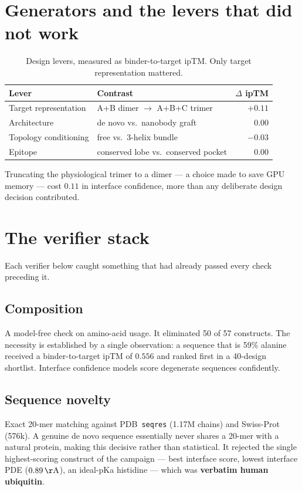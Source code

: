 \documentclass[11pt,a4paper]{article}
\newcommand{\unit}[1]{\,\mathrm{#1}}
\begin{document}
\section{Generators and the levers that did not work}

\begin{table}[htbp]
\centering
\caption{Design levers, measured as binder-to-target ipTM. Only target representation mattered.}
\label{tab:levers}
\begin{tabular}{llr}
\toprule
Lever & Contrast & $\Delta$ ipTM \\
\midrule
Target representation & A+B dimer $\rightarrow$ A+B+C trimer & $+0.11$ \\
Architecture & de novo vs.\ nanobody graft & $0.00$ \\
Topology conditioning & free vs.\ 3-helix bundle & $-0.03$ \\
Epitope & conserved lobe vs.\ conserved pocket & $0.00$ \\
\bottomrule
\end{tabular}
\end{table}

Truncating the physiological trimer to a dimer --- a choice made to save GPU memory --- cost
$0.11$ in interface confidence, more than any deliberate design decision contributed.

\section{The verifier stack}

Each verifier below caught something that had already passed every check preceding it.

\subsection{Composition}
A model-free check on amino-acid usage. It eliminated 50 of 57 constructs. The necessity is
established by a single observation: a sequence that is 59\% alanine received a
binder-to-target ipTM of $0.556$ and ranked first in a 40-design shortlist. Interface
confidence models score degenerate sequences confidently.

\subsection{Sequence novelty}
Exact 20-mer matching against PDB~\texttt{seqres} (1.17M chains) and Swiss-Prot (576k).
A genuine de novo sequence essentially never shares a 20-mer with a natural protein, making
this decisive rather than statistical. It rejected the single highest-scoring construct of the
campaign --- best interface score, lowest interface PDE ($0.89\unit{\AA}$), an
ideal-pKa histidine --- which was \textbf{verbatim human ubiquitin}.
\end{document}
